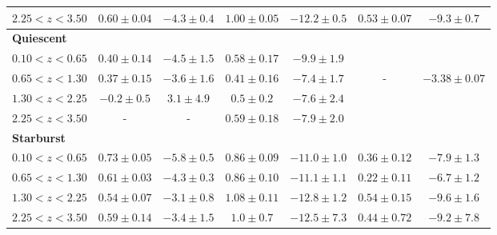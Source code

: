 \begin{table}
\begin{tabular}{l | c c | c c | c c }
$2.25<z<3.50$ & $ 0.60  \pm 0.04  $ & $ -4.3 \pm 0.4 $ & $ 1.00 \pm 0.05 $ & $-12.2 \pm 0.5$ & $ 0.53 \pm 0.07 $ & $  -9.3  \pm 0.7  $ \\
\hline
\textbf{Quiescent}  &               &                &                   &                   &                   &                     \\
$0.10<z<0.65$     & $ 0.40\pm 0.14$ & $-4.5 \pm 1.5$ & $ 0.58\pm 0.17$ & $ -9.9 \pm 1.9 $  &                   &                     \\    
$0.65<z<1.30$     & $ 0.37\pm 0.15$ & $-3.6 \pm 1.6$ & $ 0.41\pm 0.16$ & $ -7.4 \pm 1.7 $  &   -               & $ -3.38 \pm 0.07 $  \\
$1.30<z<2.25$     & $-0.2 \pm 0.5 $ & $ 3.1 \pm 4.9$ & $ 0.5 \pm 0.2 $ & $ -7.6 \pm 2.4 $  &                   &                     \\
$2.25<z<3.50$     & -               & -              & $ 0.59\pm 0.18$ & $ -7.9 \pm 2.0 $  &                   &                     \\
\hline
\textbf{Starburst}  &              &                  &                   &                   &                   &                    \\
$0.10<z<0.65$ & $ 0.73 \pm 0.05 $  & $ -5.8 \pm 0.5 $ & $ 0.86 \pm 0.09 $ & $ -11.0 \pm 1.0 $ & $ 0.36 \pm 0.12 $ & $ -7.9 \pm 1.3 $  \\  
$0.65<z<1.30$ & $ 0.61 \pm 0.03 $  & $ -4.3 \pm 0.3 $ & $ 0.86 \pm 0.10 $ & $ -11.1 \pm 1.1 $ & $ 0.22 \pm 0.11 $ & $ -6.7 \pm 1.2 $  \\
$1.30<z<2.25$ & $ 0.54 \pm 0.07 $  & $ -3.1 \pm 0.8 $ & $ 1.08 \pm 0.11 $ & $ -12.8 \pm 1.2 $ & $ 0.54 \pm 0.15 $ & $ -9.6 \pm 1.6 $  \\
$2.25<z<3.50$ & $ 0.59 \pm 0.14 $  & $ -3.4 \pm 1.5 $ & $ 1.0  \pm 0.7  $ & $ -12.5 \pm 7.3 $ & $ 0.44 \pm 0.72 $ & $ -9.2 \pm 7.8 $  \\
\hline                                   %
\end{tabular}
\end{table}

